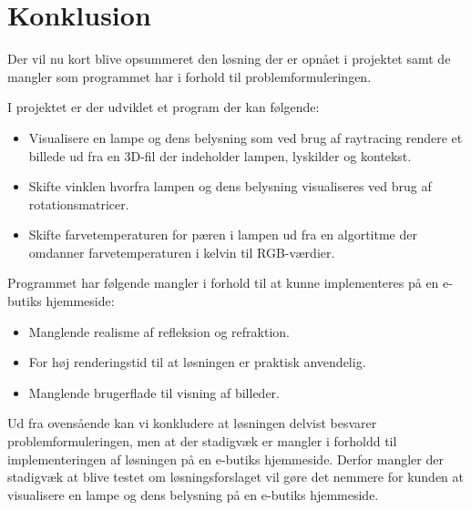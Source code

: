 \section{Konklusion}

Der vil nu kort blive opsummeret den løsning der er opnået i projektet samt de mangler som programmet har i forhold til problemformuleringen. 

I projektet er der udviklet et program der kan følgende:
\begin{itemize}
\item Visualisere en lampe og dens belysning som ved brug af raytracing rendere et billede ud fra en 3D-fil der indeholder lampen, lyskilder og kontekst.
\item Skifte vinklen hvorfra lampen og dens belysning visualiseres ved brug af rotationsmatricer. 
\item Skifte farvetemperaturen for pæren i lampen ud fra en algortitme der omdanner farvetemperaturen i kelvin til RGB-værdier. 
\end{itemize}

Programmet har følgende mangler i forhold til at kunne implementeres på en e-butiks hjemmeside:
\begin{itemize}
\item Manglende realisme af refleksion og refraktion.
\item For høj renderingstid til at løsningen er praktisk anvendelig.
\item Manglende brugerflade til visning af billeder.
\end{itemize}

Ud fra ovensående kan vi konkludere at løsningen delvist besvarer problemformuleringen, men at der stadigvæk er mangler i forholdd til implementeringen af løsningen på en e-butiks hjemmeside. Derfor mangler der stadigvæk at blive testet om løsningsforslaget vil gøre det nemmere for kunden at visualisere en lampe og dens belysning på en e-butiks hjemmeside.  

\clearpage